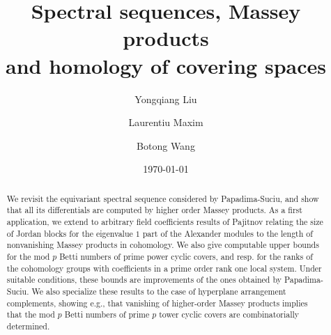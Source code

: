 \documentclass[12pt,leqno,twoside]{amsart}
\theoremstyle{plain}
\theoremstyle{definition}
\begin{document}
\title[]{Spectral sequences, Massey products \\ and  homology of covering spaces}




\author{Yongqiang Liu}
\address{Y. Liu: The Institute of Geometry and Physics, University of Science and Technology of China, 96 Jinzhai Road, Hefei, Anhui 230026 China}

\author{Laurentiu Maxim}
\address{L. Maxim: Department of Mathematics,         University of Wisconsin-Madison,  480 Lincoln Drive, Madison WI 53706-1388, USA,\newline
{\text and} \newline Institute of Mathematics of the Romanian Academy, P.O. Box 1-764, 70700 Bucharest, ROMANIA}


\author{Botong Wang}
\address{B. Wang: Department of Mathematics,         University of Wisconsin-Madison,  480 Lincoln Drive, Madison WI 53706-1388, USA.}



\date{\today}




\begin{abstract}
We revisit the equivariant spectral sequence considered by Papadima-Suciu, and show that all its differentials are computed by higher order Massey products. As a first application, we extend to arbitrary field coefficients results of Pajitnov relating the size of Jordan blocks for the eigenvalue $1$ part of the Alexander modules to the length of nonvanishing Massey products in cohomology. We also give computable upper bounds for the mod $p$ Betti numbers of prime power cyclic covers, and resp. for the ranks of the cohomology groups with coefficients in a prime order rank one local system. Under suitable conditions, these bounds are improvements of the ones obtained by Papadima-Suciu. We also specialize these results to the case of hyperplane arrangement complements, showing e.g., that vanishing of higher-order Massey products implies that the mod $p$ Betti numbers of prime $p$ tower cyclic covers are combinatorially determined. 
\end{abstract}
\end{document}
